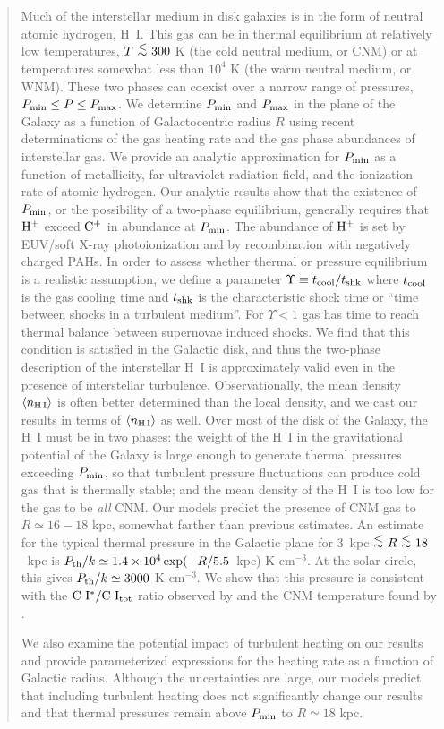 \documentclass[12pt,preprint,flushrt]{aastex}
\newcommand{\eee}{$^{-3}$}
\newcommand{\pmax}{P_{\rm max}}
\newcommand{\pmin}{P_{\rm min}}
\newcommand{\pth}{P_{\rm th}}
\newcommand{\al}{\mbox{ \raisebox{-.4ex}{$\stackrel{\textstyle <}{\sim}$} }}
\begin{document}
\begin{abstract}
        Much of the interstellar medium in disk galaxies is in the
form of neutral atomic hydrogen, H~I.  This gas can be in thermal
equilibrium at relatively low temperatures, $T\al 300$ K
(the cold neutral medium, or CNM) or at temperatures somewhat
less than $10^4$ K (the warm neutral medium, or WNM).
These two phases can coexist over a narrow range of pressures,
$\pmin\leq P\leq\pmax$.
We determine $\pmin$ and $\pmax$
in the plane of the Galaxy as
a function of Galactocentric radius $R$ using recent determinations
of the gas heating rate and the gas phase abundances of
interstellar gas.
We provide an analytic
approximation for $P_{\rm min}$ as a function of metallicity,
far-ultraviolet radiation field, and the ionization rate of
atomic hydrogen. Our analytic results show that the existence
of $\pmin$, or the possibility of a two-phase equilibrium, generally
requires that ${\rm H^+}$ exceed ${\rm C^+}$ in abundance
at $\pmin$. The abundance of ${\rm H^+}$ is set by EUV/soft X-ray
photoionization and by recombination with negatively charged PAHs.
In order to assess whether thermal or pressure equilibrium is
a realistic assumption,
we define a parameter $\Upsilon\equiv t_{\rm cool}/t_{\rm shk}$
where $t_{\rm cool}$ is the gas cooling time and $t_{\rm shk}$ is the
characteristic shock time or ``time between shocks in a turbulent
medium''. For $\Upsilon < 1$ gas has time to reach
thermal balance between supernovae induced shocks. We find that
this condition is satisfied
in the Galactic disk, and thus
the two-phase description of the interstellar H~I is approximately
valid even in the presence of interstellar turbulence.
Observationally, the mean density $\langle n_{\rm H\, I} \rangle$
is often better determined
than the local density, and we cast our results in terms of
$\langle n_{\rm H\, I} \rangle$ as well.
Over most of the disk of the Galaxy, the
H~I must be in two phases: the weight of the H~I in the
gravitational potential of the Galaxy is large enough to
generate thermal pressures exceeding $\pmin$, so that turbulent
pressure fluctuations can produce cold gas that is
thermally stable; and the mean density of the H~I is too
low for the gas to be {\em all} CNM. Our models predict
the presence of CNM gas to $R\simeq 16-18$ kpc, somewhat
farther than previous estimates.  An estimate for the
typical thermal pressure in the Galactic plane for
3~kpc$\al R\al 18$~kpc
is $\pth/k\simeq 1.4\times 10^4\exp(-R/5.5$~kpc) K cm\eee.
At the solar circle, this gives $\pth/k \simeq 3000$ K cm\eee.
We show that this pressure is consistent with the
${\rm C~I^*/C~I_{tot}}$ ratio observed by \cite{jen01}
and the CNM temperature found by \cite{hei02}.

We also examine the potential impact of turbulent heating on our results
and provide parameterized expressions for the heating rate as a
function of Galactic radius. Although the uncertainties are large,
our models predict that including turbulent heating does not
significantly change
our results and that thermal pressures remain above
$P_{\rm min}$ to $R\simeq 18$ kpc. 

\end{abstract}
\end{document}
